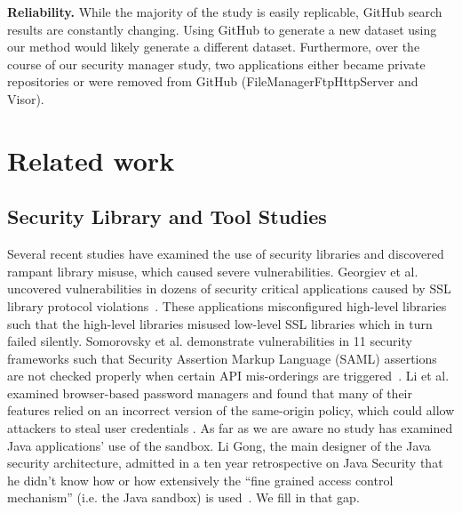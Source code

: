 \documentclass{sig-alternate}
\newcommand{\minisec}[1]{\vspace{2ex}\noindent\textbf{#1}}
\begin{document}
\minisec{Reliability.}
While the majority of the study is easily replicable, GitHub search results are constantly
changing. Using GitHub to generate a new dataset using our method
would likely generate a different dataset. Furthermore, over the course of our security
manager study, two applications either became private repositories
or were removed from GitHub (FileManagerFtpHttpServer and Visor).

\section{Related work}
\label{sec:related}

\subsection{Security Library and Tool Studies}

Several recent studies have examined the use of security libraries
and discovered rampant library misuse, which caused severe vulnerabilities.
Georgiev et al. uncovered vulnerabilities in dozens of security critical
applications caused by SSL library protocol violations~\cite{georgiev12most-dangerous}.
These applications misconfigured high-level libraries such that the
high-level libraries misused low-level SSL libraries which in turn
failed silently. Somorovsky et al. demonstrate vulnerabilities in
11 security frameworks such that Security Assertion Markup Language
(SAML) assertions are not checked properly when certain API mis-orderings
are triggered~\cite{somorovsky12breaking}. Li et al. examined browser-based
password managers and found that many of their features relied on
an incorrect version of the same-origin policy, which could allow
attackers to steal user credentials \cite{li2014emperor}. As far
as we are aware no study has examined Java applications' use of the
sandbox. Li Gong, the main designer of the Java security architecture,
admitted in a ten year retrospective on Java Security that he didn't
know how or how extensively the ``fine grained access control mechanism''
(i.e. the Java sandbox) is used~\cite{gong2009java}. We fill in that
gap. 
\end{document}
